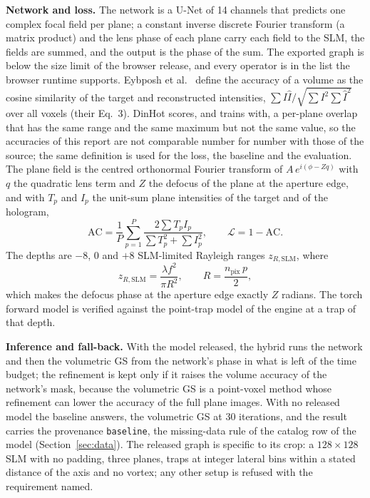 \textbf{Network and loss.} The network is a U-Net of 14 channels that predicts one complex focal field per plane; a constant inverse discrete Fourier transform (a matrix product) and the lens phase of each plane carry each field to the SLM, the fields are summed, and the output is the phase of the sum. The exported graph is below the size limit of the browser release, and every operator is in the list the browser runtime supports. Eybposh et al.~\cite{eybposh} define the accuracy of a volume as the cosine similarity of the target and reconstructed intensities, $\sum I\hat I/\sqrt{\sum I^2\sum\hat I^2}$ over all voxels (their Eq.~3). DinHot scores, and trains with, a per-plane overlap that has the same range and the same maximum but not the same value, so the accuracies of this report are not comparable number for number with those of the source; the same definition is used for the loss, the baseline and the evaluation. The plane field is the centred orthonormal Fourier transform of $A\,e^{i(\phi-Zq)}$ with $q$ the quadratic lens term and $Z$ the defocus of the plane at the aperture edge, and with $T_p$ and $I_p$ the unit-sum plane intensities of the target and of the hologram,
\begin{equation}
\mathrm{AC}=\frac1P\sum_{p=1}^{P}\frac{2\sum T_pI_p}{\sum T_p^2+\sum I_p^2},\qquad \mathcal L=1-\mathrm{AC}.
\label{eq:m17}
\end{equation}
The depths are $-8$, $0$ and $+8$ SLM-limited Rayleigh ranges $z_{R,\mathrm{SLM}}$, where
\begin{equation}
z_{R,\mathrm{SLM}}=\frac{\lambda f^2}{\pi R^2},\qquad R=\frac{n_{\mathrm{pix}}\,p}{2},
\label{eq:m17-zr}
\end{equation}
which makes the defocus phase at the aperture edge exactly $Z$ radians. The torch forward model is verified against the point-trap model of the engine at a trap of that depth.

\textbf{Inference and fall-back.} With the model released, the hybrid runs the network and then the volumetric GS from the network's phase in what is left of the time budget; the refinement is kept only if it raises the volume accuracy of the network's mask, because the volumetric GS is a point-voxel method whose refinement can lower the accuracy of the full plane images. With no released model the baseline answers, the volumetric GS at 30 iterations, and the result carries the provenance \texttt{baseline}, the missing-data rule of the catalog row of the model (Section~\ref{sec:data}). The released graph is specific to its crop: a $128\times128$ SLM with no padding, three planes, traps at integer lateral bins within a stated distance of the axis and no vortex; any other setup is refused with the requirement named.

